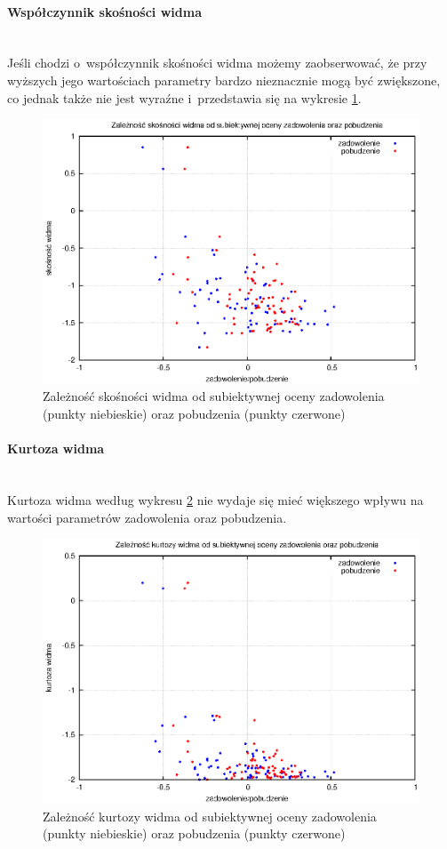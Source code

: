 \paragraph{Współczynnik skośności widma}\mbox{}\\
Jeśli chodzi o~współczynnik skośności widma możemy zaobserwować, że przy wyższych jego wartościach parametry bardzo nieznacznie mogą być zwiększone, co jednak także nie jest wyraźne i~przedstawia się na wykresie \ref{wykresSkewness}.
\begin{figure}[ht!]
\centering
\includegraphics[scale=\imageSize]{res/skewness.eps}
\caption{Zależność skośności widma od subiektywnej oceny zadowolenia (punkty niebieskie) oraz pobudzenia (punkty czerwone)\label{wykresSkewness}}
\end{figure}
\paragraph{Kurtoza widma}\mbox{}\\
Kurtoza widma według wykresu \ref{wykresKurtosis} nie wydaje się mieć większego wpływu na wartości parametrów zadowolenia oraz pobudzenia.
\begin{figure}[ht!]
\centering
\includegraphics[scale=\imageSize]{res/kurtosis.eps}
\caption{Zależność kurtozy widma od subiektywnej oceny zadowolenia (punkty niebieskie) oraz pobudzenia (punkty czerwone)\label{wykresKurtosis}}
\end{figure}
